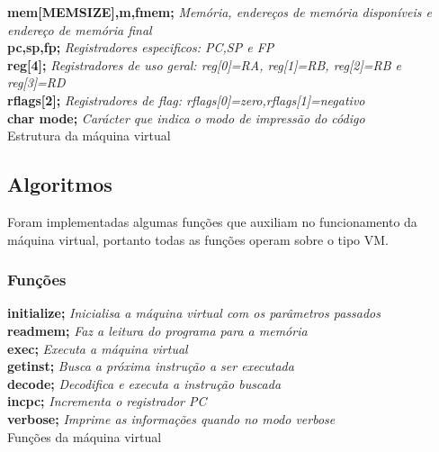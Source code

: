 \documentclass[12pt]{article}
\begin{document}
\begin{algorithm}[h!]
\begin{footnotesize}
   \textbf{mem[MEMSIZE],m,fmem;} \textit{Memória, endereços de memória disponíveis e
   endereço de memória final} \\
   \textbf{pc,sp,fp;} \textit{Registradores especificos: PC,SP e FP} \\
   \textbf{reg[4];} \textit{Registradores de uso geral: reg[0]=RA, reg[1]=RB, reg[2]=RB
   e reg[3]=RD}\\
   \textbf{rflags[2];} \textit{Registradores de flag:
   rflags[0]=zero,rflags[1]=negativo}\\
   \textbf{char mode;} \textit{Carácter que indica o modo de impressão do código}\\
\caption{Estrutura da máquina virtual}
\end{footnotesize}
\end{algorithm}

\subsection{Algoritmos}

Foram implementadas algumas funções que auxiliam no funcionamento da máquina
virtual, portanto todas as funções operam sobre o tipo VM.

\subsubsection{Funções}
\begin{algorithm}[h!]
\begin{footnotesize}
   \textbf{initialize;} \textit{Inicialisa a máquina virtual com os parâmetros
   passados} \\
   \textbf{readmem;} \textit{Faz a leitura do programa para a memória} \\
   \textbf{exec;} \textit{Executa a máquina virtual} \\
   \textbf{getinst;} \textit{Busca a próxima instrução a ser executada} \\
   \textbf{decode;} \textit{Decodifica e executa a instrução buscada} \\
   \textbf{incpc;} \textit{Incrementa o registrador PC} \\
   \textbf{verbose;} \textit{Imprime as informações quando no modo verbose} \\

\caption{Funções da máquina virtual}
\end{footnotesize}
\end{algorithm}
\end{document}
